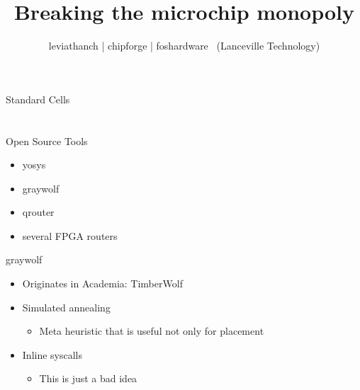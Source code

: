 \documentclass[aspectratio=169]{beamer}
\author{leviathanch | chipforge | foshardware \ (Lanceville Technology)}
\title{Breaking the microchip monopoly}
\begin{document}

\section[Standard Cells]{}
\begin{frame}{Standard Cells}
\end{frame}

\section[Silicon Compiler]{}
\begin{frame}{Open Source Tools}
	\begin{itemize}
        \setlength\itemsep{1em}
		\item yosys
		\item graywolf
		\item qrouter
		\item several FPGA routers
	\end{itemize}
\end{frame}

\begin{frame}{graywolf}
	\begin{itemize}
        \setlength\itemsep{1em}
		\item Originates in Academia: TimberWolf
		\item Simulated annealing
	        \begin{itemize}
		    \item Meta heuristic that is useful not only for placement
	        \end{itemize}
		\item Inline syscalls
	        \begin{itemize}
		    \item This is just a bad idea
	        \end{itemize}
	\end{itemize}
\end{frame}
\end{document}

